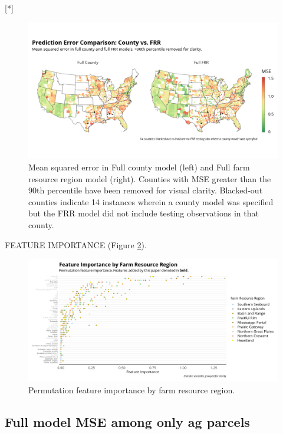 \documentclass[12pt]{article}
\begin{document}
[*]

\begin{figure}
    \centering
    \includegraphics[width=1\textwidth]{exhibits/compare_ffb_fcb_mse.png}
    \caption{Mean squared error in Full county model (left) and Full farm resource region model (right). Counties with MSE greater than the 90th percentile have been removed for visual clarity. Blacked-out counties indicate 14 instances wherein a county model was specified but the FRR model did not include testing observations in that county.}
    \label{fig:compare_ffb_fcb_mse}
\end{figure}

FEATURE IMPORTANCE (Figure \ref{fig:ffb_importance_all}).

\begin{figure}
    \centering
    \includegraphics[width=1\textwidth]{exhibits/ffb_importance_all.png}
    \caption{Permutation feature importance by farm resource region.}
    \label{fig:ffb_importance_all}
\end{figure}




\subsection{Full model MSE among only ag parcels}
\end{document}
